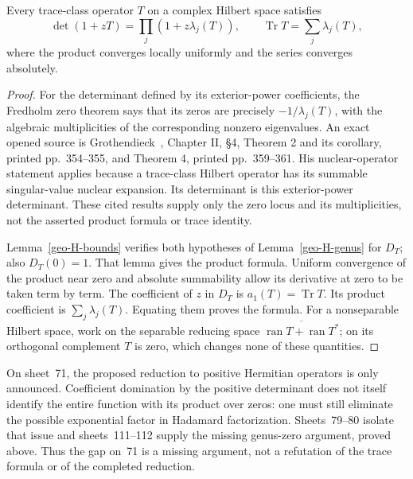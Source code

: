 \begin{theorem}
\label{geo-H-lidskii}
Every trace-class operator $T$ on a complex Hilbert space satisfies
\[
 \det(1+zT)=\prod_j(1+z\lambda_j(T)),\qquad
 \operatorname{Tr}T=\sum_j\lambda_j(T),
\]
where the product converges locally uniformly and the series converges
absolutely.
\end{theorem}
\begin{proof}
For the determinant defined by its exterior-power coefficients, the Fredholm
zero theorem says that its zeros are precisely $-1/\lambda_j(T)$, with the
algebraic multiplicities of the corresponding nonzero eigenvalues. An exact
opened source is Grothendieck~\cite{Grothendieck1956Fredholm}, Chapter II,
\S4, Theorem 2 and its corollary, printed pp.~354--355, and Theorem 4,
printed pp.~359--361. His
nuclear-operator statement applies because a trace-class Hilbert operator
has its summable singular-value nuclear expansion. Its determinant is this
exterior-power determinant. These cited results supply only the zero locus
and its multiplicities, not the asserted product formula or trace identity.

Lemma~\ref{geo-H-bounds} verifies both hypotheses of
Lemma~\ref{geo-H-genus} for $D_T$; also $D_T(0)=1$. That lemma gives the
product formula. Uniform convergence of the product near zero and absolute
summability allow its derivative at zero to be taken term by term. The
coefficient of $z$ in $D_T$ is $a_1(T)=\operatorname{Tr}T$. Its product
coefficient is $\sum_j\lambda_j(T)$. Equating them proves the formula.
For a nonseparable Hilbert space, work on the separable reducing space
$\overline{\operatorname{ran}T+\operatorname{ran}T^*}$; on its orthogonal
complement $T$ is zero, which changes none of these quantities.
\end{proof}

On sheet~71, the proposed reduction to positive Hermitian operators is
only announced. Coefficient domination by the positive determinant does
not itself identify the entire function with its product over zeros:
one must still eliminate the possible exponential factor in Hadamard
factorization. Sheets~79--80 isolate that issue and sheets~111--112 supply
the missing genus-zero argument, proved above. Thus the gap on~71 is a
missing argument, not a refutation of the trace formula or of the
completed reduction.

